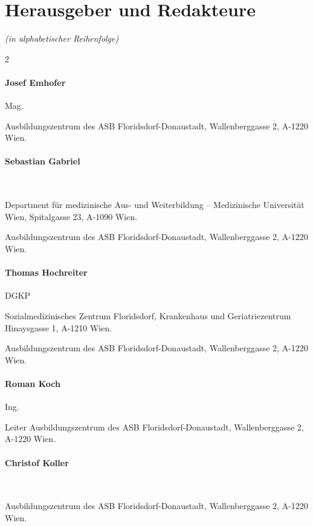 \documentclass[
ngerman,
paper=a4,
asymmetric,
fontsize=9pt,
headings=small,
draft=false,
parskip=false,
footnotes=multiple,
]{scrbook}
\begin{document}
\clearpage
\section*{Herausgeber und Redakteure}
\emph{\tiny{(in alphabetischer Reihenfolge)}}


\begin{multicols}{2}
    
 \paragraph{Josef Emhofer}
    Mag. 
    
    Ausbildungszentrum des ASB Floridsdorf-Donaustadt,    
    Wallenberggasse 2, A-1220 Wien.

    \paragraph{Sebastian Gabriel}~
    
    Department für medizinische Aus- und Weiterbildung -- Medizinische
    Universität Wien, 
    Spitalgasse 23, A-1090 Wien.

    Ausbildungszentrum des ASB Floridsdorf-Donaustadt,    
    Wallenberggasse 2, A-1220 Wien.

    
    \paragraph{Thomas Hochreiter}
    DGKP

    Sozialmedizinisches Zentrum Floridsdorf, Krankenhaus und Geriatriezentrum
    Hinaysgasse 1, A-1210 Wien.
    
    Ausbildungszentrum des ASB Floridsdorf-Donaustadt,    
    Wallenberggasse 2, A-1220 Wien.
    
    \paragraph{Roman Koch} 
    Ing.
    
    Leiter Ausbildungszentrum des ASB
    Floridsdorf-Donaustadt, Wallenberggasse 2, A-1220 Wien.
    
    \paragraph{Christof Koller}~
    
    Ausbildungszentrum des ASB Floridsdorf-Donaustadt,
    Wallenberggasse 2, A-1220 Wien.
    

\end{multicols}
\end{document}
